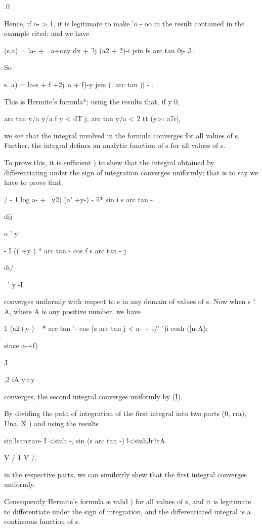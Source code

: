 .0

Hence, if o- > 1, it is legitimate to make 'o - oo in the result
contained in the example cited; and we have

 (s,a) = la- +\ \ a+ocy dx + 'lj (a2 + 2)-i jsin fs arc tan 0j- J .

So

  s, a) = la-s + f +2j\ a + f)-y jsin (. arc tan )| - .

This is Hermite's formula*; using the results that, if y 0,

arc tan y/a y/a f y < dT j, arc tan y/a < 2 tt (y>: a7r],

we see that the integral involved in the formula converges for all
values of s. Further, the integral defines an analytic function of s
for all values of s.

To prove this, it is sufficient ) to shew that the integral
obtained by differentiating under the sign of integration converges
uniformly; that is to say we have to prove that

/ - 1 log a- + \ y2) (a' +y-) - 5* sin i s arc tan -

dij

o ' y

- I (( +y ) * arc tan - cos f s arc tan - j

di/

~' y -I

converges uniformly with respect to s in any domain of values of s.
Now when s ! A, where A is any positive number, we have

1 (a2+y-) ~ * arc tan '- cos (s arc tan j < a- + i/' ')i cosh (|n-A);

since a-+f)

  J

,2 iA y±y\

converges, the second integral converges uniformly by (I).

By dividing the path of integration of the first integral into two
parts (0, rra), Una, X ) and using the results

sin'lsarctau- I <sinh -, sin (s arc tan -) l<sinhJr7rA

V / 1 V /,

in the respective parts, we can simihxrly shew that the first integral
converges uniformly.

Consequently Hermite's formula is valid ) for all values of s,
and it is legitimate to differentiate under the sign of integration,
and the differentiated integral is a continuous function of s.

